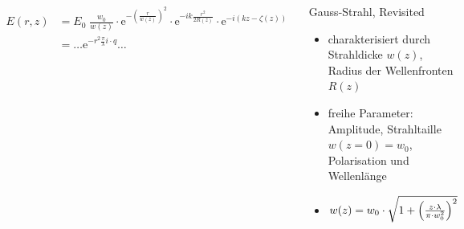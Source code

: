 \documentclass[10pt, aspectratio=169]{beamer}
\begin{document}
\begin{frame}
  \begin{columns}
    \begin{figure}
      \includegraphics[width=1\columnwidth]{gauss-strahl.png}
    \end{figure}
    \begin{align*}
      \label{eq:gauss}
      \displaystyle E(r,z)&=E_{0}\;{\frac {w_{0}}{w(z)}}\cdot \mathrm
                            {e} ^{-\left({\frac {r}{w(z)}}\right)^{2}}\cdot \mathrm {e}
                            ^{-ik{\frac {r^{2}}{2R(z)}}}\cdot \mathrm {e} ^{-i(kz-\zeta
                            (z))} \\
                          &= \ldots \mathrm{e}^{-r^2 \frac{\pi}{\lambda}i\cdot q}\ldots
    \end{align*}
    \begin{block}{Gauss-Strahl, Revisited}
      \begin{itemize}
      \item charakterisiert durch Strahldicke \(w(z)\), Radius der
        Wellenfronten \(R(z)\)
        \pause
      \item freihe Parameter: Amplitude, Strahltaille \(w(z=0)=w_0\),
        Polarisation und Wellenl\"ange
      \pause
    \item \(w(z)=w_0\cdot\sqrt{1+\qty( \frac{z\cdot\lambda}{\pi\cdot w_0^2})^2}\)
      \end{itemize}
    \end{block}

  \end{columns}
\end{frame}
\end{document}
